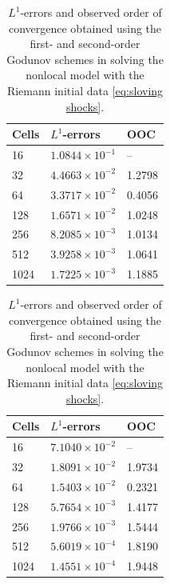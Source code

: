 \begin{table}[H]
    \centering
    \begin{minipage}{0.45\textwidth}
        \centering
        \begin{tabular}{ |p{1.5cm}||p{2.2cm}| |p{1.5cm}| }
            \hline
            \textbf{Cells } & $L^{1}$-\textbf{errors} & \textbf{OOC} \\
            \hline
            16              & $1.0844 \times 10^{-1}$ & --           \\
            32              & $4.4663 \times 10^{-2}$ & 1.2798       \\
            64              & $3.3717 \times 10^{-2}$ & 0.4056       \\
            128             & $1.6571 \times 10^{-2}$ & 1.0248       \\
            256             & $8.2085 \times 10^{-3}$ & 1.0134       \\
            512             & $3.9258 \times 10^{-3}$ & 1.0641       \\
            1024            & $1.7225 \times 10^{-3}$ & 1.1885       \\
            \hline
        \end{tabular}
        \caption*{(a) First-order Godunov scheme}
    \end{minipage}
    \hfill
    \begin{minipage}{0.5\textwidth}
        \centering
        \begin{tabular}{ |p{1.5cm}||p{2.2cm}| |p{1.5cm}| }
            \hline
            \textbf{Cells } & $L^{1}$-\textbf{errors}  & \textbf{OOC} \\
            \hline
            16              & $7.1040 \times 10^{-2}$  & --           \\
            32              & $ 1.8091 \times 10^{-2}$ & 1.9734       \\
            64              & $1.5403 \times 10^{-2}$  & 0.2321       \\
            128             & $5.7654 \times 10^{-3}$  & 1.4177       \\
            256             & $1.9766 \times 10^{-3}$  & 1.5444       \\
            512             & $5.6019 \times 10^{-4}$  & 1.8190       \\
            1024            & $1.4551 \times 10^{-4}$  & 1.9448       \\
            \hline
        \end{tabular}
        \caption*{(b) Second-order Godunov scheme}
    \end{minipage}

    \caption{$L^{1}$-errors and observed order of convergence obtained using the first- and second-order Godunov schemes in solving the nonlocal model with the Riemann initial data \eqref{eq:sloving shocks}.}
    \label{tab:table_8}
\end{table}


